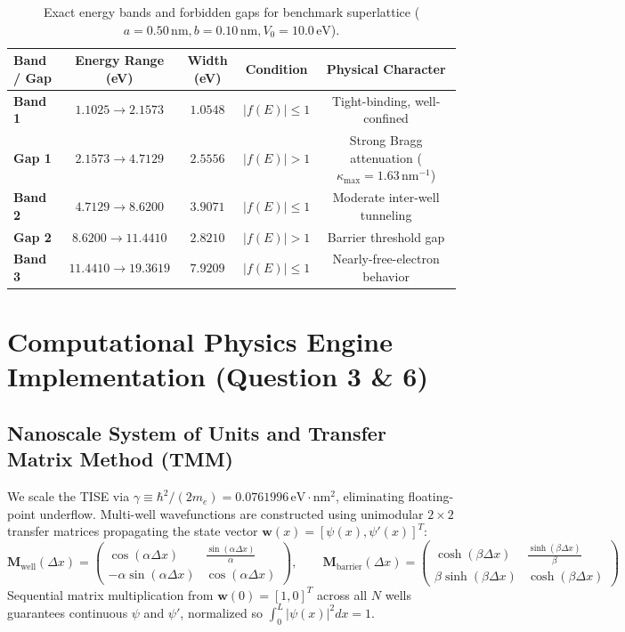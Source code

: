 \documentclass[10pt, a4paper]{article}
\begin{document}
\begin{table}[H]
\centering\small
\caption{Exact energy bands and forbidden gaps for benchmark superlattice ($a=0.50\,\text{nm}, b=0.10\,\text{nm}, V_0=10.0\,\text{eV}$).}
\label{tab:bands}
\begin{tabular}{lcccc}
\toprule
\textbf{Band / Gap} & \textbf{Energy Range (eV)} & \textbf{Width (eV)} & \textbf{Condition} & \textbf{Physical Character} \\
\midrule
\textbf{Band 1} & $1.1025 \longrightarrow 2.1573$ & $1.0548$ & $|f(E)| \le 1$ & Tight-binding, well-confined \\
\textbf{Gap 1}  & $2.1573 \longrightarrow 4.7129$ & $2.5556$ & $|f(E)| > 1$ & Strong Bragg attenuation ($\kappa_{\max}=1.63\,\text{nm}^{-1}$) \\
\textbf{Band 2} & $4.7129 \longrightarrow 8.6200$ & $3.9071$ & $|f(E)| \le 1$ & Moderate inter-well tunneling \\
\textbf{Gap 2}  & $8.6200 \longrightarrow 11.4410$ & $2.8210$ & $|f(E)| > 1$ & Barrier threshold gap \\
\textbf{Band 3} & $11.4410 \longrightarrow 19.3619$ & $7.9209$ & $|f(E)| \le 1$ & Nearly-free-electron behavior \\
\bottomrule
\end{tabular}
\end{table}

\section{Computational Physics Engine Implementation (Question 3 \& 6)}

\subsection{Nanoscale System of Units and Transfer Matrix Method (TMM)}
We scale the TISE via $\gamma \equiv \hbar^2/(2m_e) = 0.0761996\,\text{eV}\cdot\text{nm}^2$, eliminating floating-point underflow. Multi-well wavefunctions are constructed using unimodular $2\times 2$ transfer matrices propagating the state vector $\mathbf{w}(x) = [\psi(x), \psi'(x)]^T$:
\begin{equation}
\mathbf{M}_{\text{well}}(\Delta x) = \begin{pmatrix} \cos(\alpha\Delta x) & \frac{\sin(\alpha\Delta x)}{\alpha} \\ -\alpha\sin(\alpha\Delta x) & \cos(\alpha\Delta x) \end{pmatrix}, \qquad
\mathbf{M}_{\text{barrier}}(\Delta x) = \begin{pmatrix} \cosh(\beta\Delta x) & \frac{\sinh(\beta\Delta x)}{\beta} \\ \beta\sinh(\beta\Delta x) & \cosh(\beta\Delta x) \end{pmatrix}
\end{equation}
Sequential matrix multiplication from $\mathbf{w}(0) = [1, 0]^T$ across all $N$ wells guarantees continuous $\psi$ and $\psi'$, normalized so $\int_0^L |\psi(x)|^2 dx = 1$.
\end{document}
